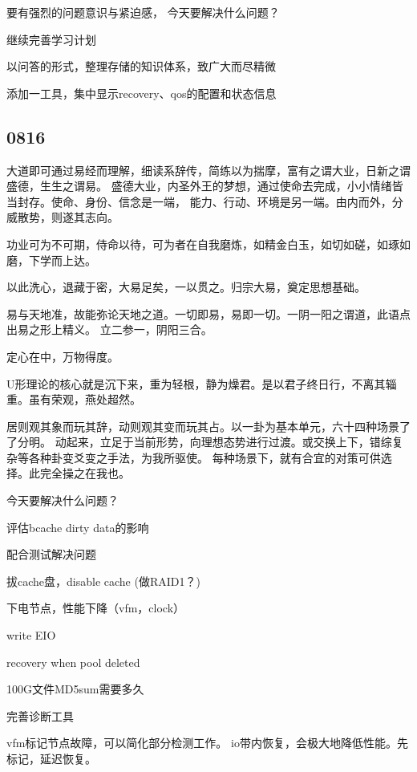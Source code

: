 要有强烈的问题意识与紧迫感，
今天要解决什么问题？
\begin{enumbox}
\item 继续完善学习计划
\item 以问答的形式，整理存储的知识体系，致广大而尽精微
\item 添加一工具，集中显示recovery、qos的配置和状态信息
\end{enumbox}

\subsection{0816}

大道即可通过易经而理解，细读系辞传，简练以为揣摩，富有之谓大业，日新之谓盛德，生生之谓易。
盛德大业，内圣外王的梦想，通过使命去完成，小小情绪皆当封存。使命、身份、信念是一端，
能力、行动、环境是另一端。由内而外，分威散势，则遂其志向。

功业可为不可期，侍命以待，可为者在自我磨炼，如精金白玉，如切如磋，如琢如磨，下学而上达。

以此洗心，退藏于密，大易足矣，一以贯之。归宗大易，奠定思想基础。

易与天地准，故能弥论天地之道。一切即易，易即一切。一阴一阳之谓道，此语点出易之形上精义。
立二参一，阴阳三合。

定心在中，万物得度。

U形理论的核心就是沉下来，重为轻根，静为燥君。是以君子终日行，不离其辎重。虽有荣观，燕处超然。

居则观其象而玩其辞，动则观其变而玩其占。以一卦为基本单元，六十四种场景了了分明。
动起来，立足于当前形势，向理想态势进行过渡。或交换上下，错综复杂等各种卦变爻变之手法，为我所驱使。
每种场景下，就有合宜的对策可供选择。此完全操之在我也。

今天要解决什么问题？
\begin{enumbox}
\item 评估bcache dirty data的影响
\item 配合测试解决问题
\item 拔cache盘，disable cache (做RAID1？)
\item 下电节点，性能下降（vfm，clock）
\item write EIO
\item recovery when pool deleted
\item 100G文件MD5sum需要多久
\item 完善诊断工具
\end{enumbox}

vfm标记节点故障，可以简化部分检测工作。
io带内恢复，会极大地降低性能。先标记，延迟恢复。

